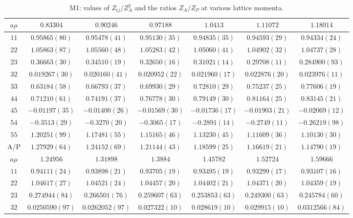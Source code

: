 \begin{table}
\begin{center}
\caption{M1: values of $Z_{ij}/Z_A^2$ and the ratios $Z_A/Z_P$ at various lattice momenta.}
\begin{tabular}{c|c c c c c c}
\hline
\hline
$a\mu$ & $0.83304$ & $0.90246$ & $0.97188$ & $1.0413$ & $1.11072$ & $1.18014$ \\
\hline
$11$ & $0.95865(80)$ & $0.95478(41)$ & $0.95130(35)$ & $0.94835(35)$ & $0.94593(29)$ & $0.94334(24)$ \\
$22$ & $1.05863(87)$ & $1.05560(48)$ & $1.05283(42)$ & $1.05060(41)$ & $1.04902(32)$ & $1.04737(28)$ \\
$23$ & $0.36663(30)$ & $0.34510(19)$ & $0.32650(16)$ & $0.31021(14)$ & $0.29708(11)$ & $0.284900(93)$ \\
$32$ & $0.019267(30)$ & $0.020160(41)$ & $0.020952(22)$ & $0.021960(17)$ & $0.022876(20)$ & $0.023976(11)$ \\
$33$ & $0.63184(58)$ & $0.66793(37)$ & $0.69930(29)$ & $0.72810(29)$ & $0.75237(25)$ & $0.77606(19)$ \\
$44$ & $0.71210(61)$ & $0.74191(37)$ & $0.76778(30)$ & $0.79149(30)$ & $0.81164(25)$ & $0.83145(21)$ \\
$45$ & $-0.01197(35)$ & $-0.01400(26)$ & $-0.01569(30)$ & $-0.01736(17)$ & $-0.01903(21)$ & $-0.02069(12)$ \\
$54$ & $-0.3513(29)$ & $-0.3270(20)$ & $-0.3065(17)$ & $-0.2891(14)$ & $-0.2749(11)$ & $-0.26219(98)$ \\
$55$ & $1.20251(99)$ & $1.17481(55)$ & $1.15165(46)$ & $1.13230(45)$ & $1.11609(36)$ & $1.10130(30)$ \\
\hline
A/P & $1.27929(64)$ & $1.24152(69)$ & $1.21144(43)$ & $1.18599(25)$ & $1.16619(21)$ & $1.14790(19)$ \\
\hline
$a\mu$ & $1.24956$ & $1.31898$ & $1.3884$ & $1.45782$ & $1.52724$ & $1.59666$ \\
\hline
$11$ & $0.94111(24)$ & $0.93898(21)$ & $0.93705(19)$ & $0.93495(19)$ & $0.93299(17)$ & $0.93107(16)$ \\
$22$ & $1.04617(27)$ & $1.04521(24)$ & $1.04457(20)$ & $1.04402(21)$ & $1.04371(20)$ & $1.04359(19)$ \\
$23$ & $0.274944(84)$ & $0.266501(76)$ & $0.259607(63)$ & $0.253853(63)$ & $0.249300(63)$ & $0.245784(60)$ \\
$32$ & $0.0250590(97)$ & $0.0262052(97)$ & $0.027322(10)$ & $0.028619(10)$ & $0.029915(10)$ & $0.0312566(84)$ \\

\end{tabular}
\end{center}
\end{table}
